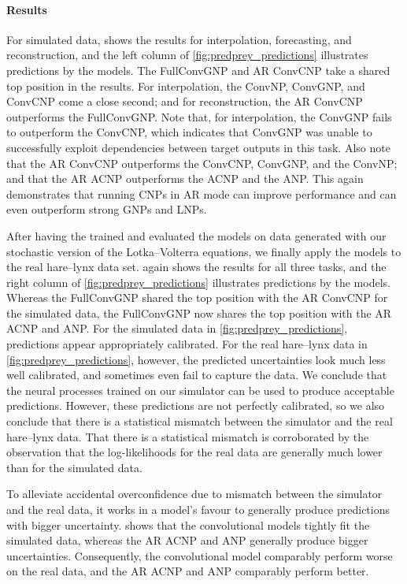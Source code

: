 \documentclass[12pt, twoside]{report}
\begin{document}
\paragraph{Results}
For simulated data,
 shows the results for interpolation, forecasting, and reconstruction, and
the left column of \cref{fig:predprey_predictions} illustrates predictions by the models.
The FullConvGNP and AR ConvCNP take a shared top position in the results.
For interpolation, the ConvNP, ConvGNP, and ConvCNP come a close second;
and for reconstruction, the AR ConvCNP outperforms the FullConvGNP.
Note that, for interpolation, the ConvGNP fails to outperform the ConvCNP,
which indicates that ConvGNP was unable to successfully exploit dependencies between target outputs in this task.
Also note that the AR ConvCNP outperforms the ConvCNP, ConvGNP, and the ConvNP;
and that the AR ACNP outperforms the ACNP and the ANP.
This again demonstrates that running CNPs in AR mode can improve performance and can even outperform strong GNPs and LNPs.

After having the trained and evaluated the models on data generated with our stochastic version of the Lotka--Volterra equations, we finally apply the models to the real hare--lynx data set.
 again shows the results for all three tasks,
and the right column of \cref{fig:predprey_predictions} illustrates predictions by the models.
Whereas the FullConvGNP shared the top position with the AR ConvCNP for the simulated data,
the FullConvGNP now shares the top position with the AR ACNP and ANP.
For the simulated data in \cref{fig:predprey_predictions}, predictions appear appropriately calibrated.
For the real hare--lynx data in \cref{fig:predprey_predictions}, however, the predicted uncertainties look much less well calibrated,
and sometimes even fail to capture the data.
We conclude that the neural processes trained on our simulator can be used to produce acceptable predictions.
However, these predictions are not perfectly calibrated,
so we also conclude that there is a statistical mismatch between the simulator and the real hare--lynx data.
That there is a statistical mismatch is corroborated by the observation
 that the log-likelihoods for the real data are generally much lower than for the simulated data.

To alleviate accidental overconfidence due to mismatch between the simulator and the real data,
it works in a model's favour to generally produce predictions with bigger uncertainty.
 shows that the convolutional models tightly fit the simulated data,
whereas the AR ACNP and ANP generally produce bigger uncertainties.
Consequently, the convolutional model comparably perform worse on the real data,
and the AR ACNP and ANP comparably perform better.
\end{document}
